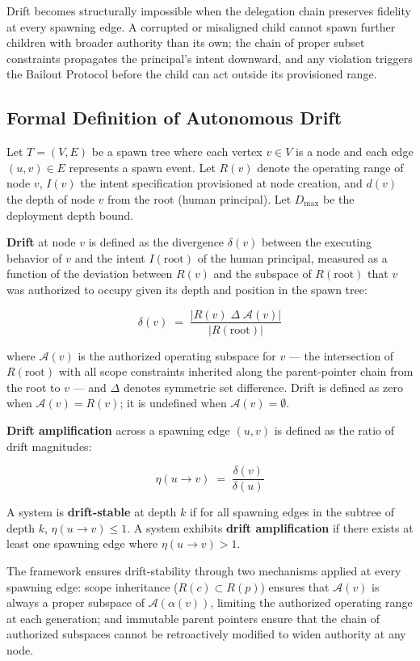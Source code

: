 Drift becomes structurally impossible when the delegation chain preserves fidelity at every spawning edge. A corrupted or misaligned child cannot spawn further children with broader authority than its own; the chain of proper subset constraints propagates the principal's intent downward, and any violation triggers the Bailout Protocol before the child can act outside its provisioned range.

\subsection{Formal Definition of Autonomous Drift}

Let $T = (V, E)$ be a spawn tree where each vertex $v \in V$ is a node and each edge $(u, v) \in E$ represents a spawn event. Let $R(v)$ denote the operating range of node $v$, $I(v)$ the intent specification provisioned at node creation, and $d(v)$ the depth of node $v$ from the root (human principal). Let $D_{\max}$ be the deployment depth bound.

\textbf{Drift} at node $v$ is defined as the divergence $\delta(v)$ between the executing behavior of $v$ and the intent $I(\text{root})$ of the human principal, measured as a function of the deviation between $R(v)$ and the subspace of $R(\text{root})$ that $v$ was authorized to occupy given its depth and position in the spawn tree:

\[
\delta(v) \;=\; \frac{|R(v) \;\Delta\; \mathcal{A}(v)|}{|R(\text{root})|}
\]

where $\mathcal{A}(v)$ is the authorized operating subspace for $v$ — the intersection of $R(\text{root})$ with all scope constraints inherited along the parent-pointer chain from the root to $v$ — and $\Delta$ denotes symmetric set difference. Drift is defined as zero when $\mathcal{A}(v) = R(v)$; it is undefined when $\mathcal{A}(v) = \emptyset$.

\textbf{Drift amplification} across a spawning edge $(u, v)$ is defined as the ratio of drift magnitudes:

\[
\eta(u \to v) \;=\; \frac{\delta(v)}{\delta(u)}
\]

A system is \textbf{drift-stable} at depth $k$ if for all spawning edges in the subtree of depth $k$, $\eta(u \to v) \leq 1$. A system exhibits \textbf{drift amplification} if there exists at least one spawning edge where $\eta(u \to v) > 1$.

The \bxthree{} framework ensures drift-stability through two mechanisms applied at every spawning edge: scope inheritance ($R(c) \subset R(p)$) ensures that $\mathcal{A}(v)$ is always a proper subspace of $\mathcal{A}(\alpha(v))$, limiting the authorized operating range at each generation; and immutable parent pointers ensure that the chain of authorized subspaces cannot be retroactively modified to widen authority at any node.

